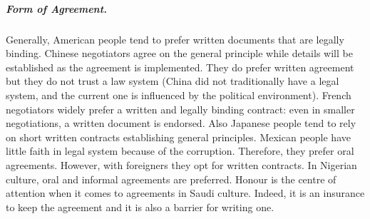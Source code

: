 \documentclass[../main.tex]{subfiles}
\begin{document}
\subparagraph{Form of Agreement.} Generally, American people tend to prefer written documents that are legally binding. Chinese negotiators agree on the general principle while details will be established as the agreement is implemented. They do prefer written agreement but they do not trust a law system (China did not traditionally have a legal system, and the current one is influenced by the political environment). French negotiators widely prefer a written and legally binding contract: even in smaller negotiations, a written document is endorsed. Also Japanese people tend to rely on short written contracts establishing general principles. Mexican people have little faith in legal system because of the corruption. Therefore, they prefer oral agreements. However, with foreigners they opt for written contracts. In Nigerian culture, oral and informal agreements are preferred. Honour is the centre of attention when it comes to agreements in Saudi culture. Indeed, it is an insurance to keep the agreement and it is also a barrier for writing one.\\

\end{document}
